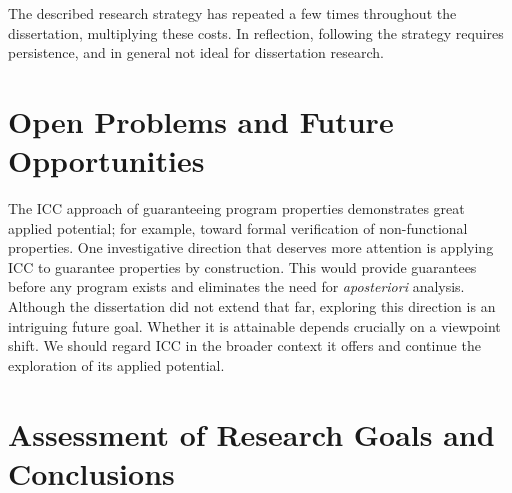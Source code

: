 The described research strategy has repeated a few times throughout the dissertation, multiplying these costs.
In reflection, following the strategy requires persistence, and in general not ideal for dissertation research.

\section{Open Problems and Future Opportunities}
\label{sec:res-future}

The ICC approach of guaranteeing program properties demonstrates great applied potential;
for example, toward formal verification of non-functional properties.
One investigative direction that deserves more attention is applying ICC to guarantee properties by construction.
This would provide guarantees before any program exists and eliminates the need for \emph{aposteriori} analysis.
Although the dissertation did not extend that far, exploring this direction is an intriguing future goal.
Whether it is attainable depends crucially on a viewpoint shift.
We should regard ICC in the broader context it offers and continue the exploration of its applied potential.


\section{Assessment of Research Goals and Conclusions}
\label{sec:res-summary}

